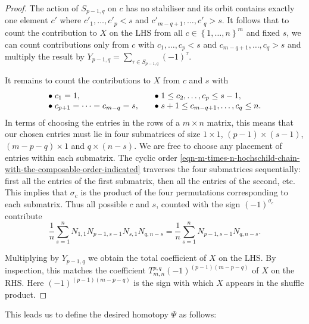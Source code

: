 \documentclass[12pt,a4paper,reqno]{amsart}
\begin{document}
\begin{proof}
The action of $S_{p-1,q}$ on $c$ has no stabiliser and
its orbit contains exactly one element $c'$ where 
$c'_1, \dots, c'_p < s$ and 
$c'_{m-q+1}, \dots, c'_{q} > s$. It follows that to count 
the contribution to $X$ on the LHS from all 
$c \in \left\{1,\dots,n\right\}^m$ and fixed $s$, we can count 
contributions only from $c$ with $c_1, \dots, c_p < s$ 
and $c_{m-q+1}, \dots, c_{q} > s$ and multiply the result by 
$Y_{p-1, q} = \sum_{\tau \in S_{p-1,q}} (-1)^\tau$. 

It remains to count the contributions to $X$ from $c$ and $s$
with 
$$
\begin{array}{l l}
\bullet\; c_1 = 1, \quad
& \bullet\; 1 \leq c_2, \dots, c_p \leq s-1, 
\\
\bullet\; c_{p+1} = \dots = c_{m-q} = s, \quad
& \bullet\; s+1 \leq c_{m-q+1}, \dots, c_{q} \leq n. 
\end{array}
$$
In terms of choosing the entries in the rows of a $m \times n$ matrix, 
this means that our chosen entries must lie in four submatrices of 
size $1 \times 1$, $(p-1) \times (s-1)$, $(m-p-q) \times 1$ 
and $q \times (n-s)$. We are free to choose any placement of entries within
each submatrix. The cyclic order 
\eqref{eqn-m-times-n-hochschild-chain-with-the-composable-order-indicated}
traverses the four submatrices sequentially: first all the entries of
the first submatrix, then all the entries of the second, etc. 
This implies that $\sigma_c$ is the product 
of the four permutations corresponding to each submatrix. 
Thus all possible $c$ and $s$, counted with the sign $(-1)^{\sigma_c}$
contribute 
$$ \frac{1}{n} \sum_{s = 1}^{n} N_{1,1} N_{p-1,s-1} N_{s,1} N_{q,n-s} = 
\frac{1}{n} \sum_{s = 1}^{n} N_{p-1,s-1} N_{q,n-s}. $$

Multiplying by $Y_{p-1,q}$ we obtain the total coefficient of $X$ 
on the LHS. By inspection, this matches the coefficient $T^{p,q}_{m,n}
(-1)^{(p-1)(m-p-q)}$ of $X$ on the RHS. Here $(-1)^{(p-1)(m-p-q)}$
is the sign with which $X$ appears in the shuffle product. 
\end{proof}

This leads us to define the desired homotopy $\Psi$ as follows:
\end{document}
